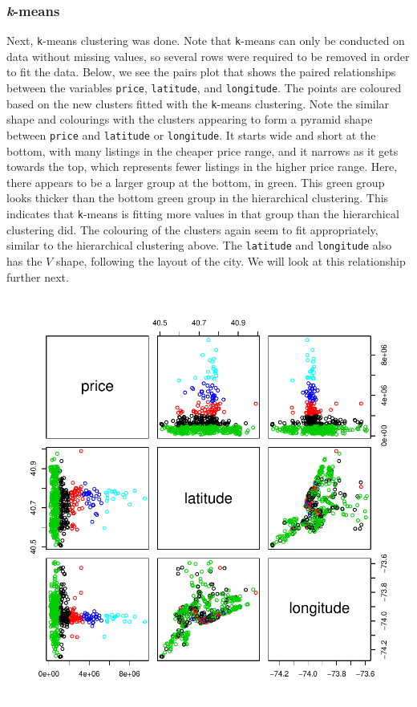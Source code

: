 \documentclass[11pt, a4paper]{article}
\begin{document}
\pagebreak
\subsubsection{\textit{k}-means}

Next, \texttt{k}-means clustering was done. Note that \texttt{k}-means can only be conducted on data without missing values, so several rows were required to be removed in order to fit the data. Below, we see the pairs plot that shows the paired relationships between the variables \texttt{price}, \texttt{latitude}, and \texttt{longitude}. The points are coloured based on the new clusters fitted with the \texttt{k}-means clustering. Note the similar shape and colourings with the clusters appearing to form a pyramid shape between \texttt{price} and \texttt{latitude} or \texttt{longitude}. It starts wide and short at the bottom, with many listings in the cheaper price range, and it narrows as it gets towards the top, which represents fewer listings in the higher price range. Here, there appears to be a larger group at the bottom, in green. This green group looks thicker than the bottom green group in the hierarchical clustering. This indicates that \texttt{k}-means is fitting more values in that group than the hierarchical clustering did. The colouring of the clusters again seem to fit appropriately, similar to the hierarchical clustering above. The \texttt{latitude} and \texttt{longitude} also has the $V$ shape, following the layout of the city. We will look at this relationship further next.


\includegraphics{project_report-015}
\end{document}
